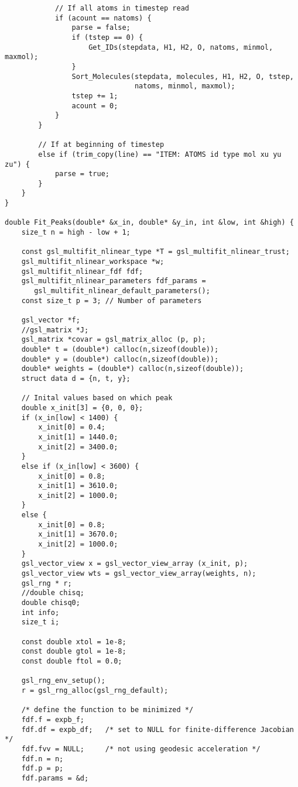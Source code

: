 \begin{singlespace}
\begin{verbatim}
            // If all atoms in timestep read
            if (acount == natoms) {
                parse = false;
                if (tstep == 0) {
                    Get_IDs(stepdata, H1, H2, O, natoms, minmol, maxmol);
                }
                Sort_Molecules(stepdata, molecules, H1, H2, O, tstep,
                               natoms, minmol, maxmol);
                tstep += 1;
                acount = 0;
            }
        }

        // If at beginning of timestep
        else if (trim_copy(line) == "ITEM: ATOMS id type mol xu yu zu") {
            parse = true;
        }
    }
}

double Fit_Peaks(double* &x_in, double* &y_in, int &low, int &high) {
    size_t n = high - low + 1;

    const gsl_multifit_nlinear_type *T = gsl_multifit_nlinear_trust;
    gsl_multifit_nlinear_workspace *w;
    gsl_multifit_nlinear_fdf fdf;
    gsl_multifit_nlinear_parameters fdf_params = 
	   gsl_multifit_nlinear_default_parameters();
    const size_t p = 3; // Number of parameters

    gsl_vector *f;
    //gsl_matrix *J;
    gsl_matrix *covar = gsl_matrix_alloc (p, p);
    double* t = (double*) calloc(n,sizeof(double));
    double* y = (double*) calloc(n,sizeof(double));
    double* weights = (double*) calloc(n,sizeof(double));
    struct data d = {n, t, y};

    // Inital values based on which peak
    double x_init[3] = {0, 0, 0};
    if (x_in[low] < 1400) {
        x_init[0] = 0.4;
        x_init[1] = 1440.0;
        x_init[2] = 3400.0;
    }
    else if (x_in[low] < 3600) {
        x_init[0] = 0.8;
        x_init[1] = 3610.0;
        x_init[2] = 1000.0;
    }
    else {
        x_init[0] = 0.8;
        x_init[1] = 3670.0;
        x_init[2] = 1000.0;
    }
    gsl_vector_view x = gsl_vector_view_array (x_init, p);
    gsl_vector_view wts = gsl_vector_view_array(weights, n);
    gsl_rng * r;
    //double chisq;
    double chisq0;
    int info;
    size_t i;

    const double xtol = 1e-8;
    const double gtol = 1e-8;
    const double ftol = 0.0;

    gsl_rng_env_setup();
    r = gsl_rng_alloc(gsl_rng_default);

    /* define the function to be minimized */
    fdf.f = expb_f;
    fdf.df = expb_df;   /* set to NULL for finite-difference Jacobian */
    fdf.fvv = NULL;     /* not using geodesic acceleration */
    fdf.n = n;
    fdf.p = p;
    fdf.params = &d;


\end{verbatim}
\end{singlespace}
